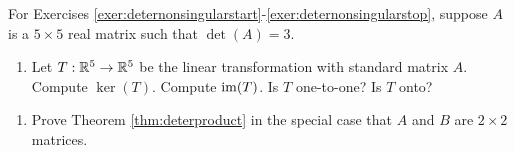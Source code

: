 \noindent For Exercises \ref{exer:deternonsingularstart}-\ref{exer:deternonsingularstop}, suppose $A$ is a $5\times 5$ real matrix such that $\det(A)=3$.
\begin{enumerate}[!HW!, label=$\spadesuit$ \arabic*., ref=\arabic*]
\itemspade For any $\bb b\in \R^5$, is the linear system $A\bb x=\bb b$ consistent? How many free variables are in the linear system $A\bb x=\bb b$? How many solutions does $A\bb x=\bb b$ have?
\itemspade Compute the row reduced echelon form of $A$.
\item\label{exer:deternonsingularstop} Let $T:\mathbb{R}^5\to \mathbb{R}^5$ be the linear transformation with standard matrix $A$. Compute $\ker(T)$. Compute $\operatorname*{im}(T)$. Is $T$ one-to-one? Is $T$ onto?\\
\end{enumerate}

\begin{enumerate}[!HW!]
\item Prove Theorem \ref{thm:deterproduct} in the special case that $A$ and $B$ are $2\times 2$ matrices. %
\end{enumerate}

 \mbox{}\vfill
 
\pagebreak